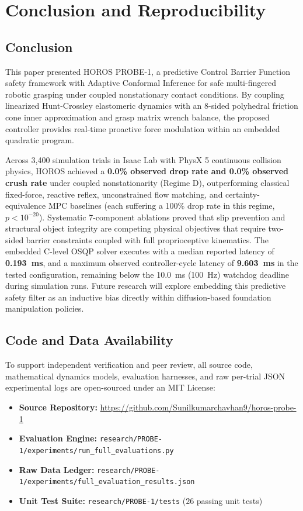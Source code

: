 \section{Conclusion and Reproducibility}
\label{sec:conclusion}

\subsection{Conclusion}
This paper presented HOROS PROBE-1, a predictive Control Barrier Function safety framework with Adaptive Conformal Inference for safe multi-fingered robotic grasping under coupled nonstationary contact conditions. By coupling linearized Hunt-Crossley elastomeric dynamics with an 8-sided polyhedral friction cone inner approximation and grasp matrix wrench balance, the proposed controller provides real-time proactive force modulation within an embedded quadratic program. 

Across 3,400 simulation trials in Isaac Lab with PhysX 5 continuous collision physics, HOROS achieved a \textbf{0.0\% observed drop rate and 0.0\% observed crush rate} under coupled nonstationarity (Regime D), outperforming classical fixed-force, reactive reflex, unconstrained flow matching, and certainty-equivalence MPC baselines (each suffering a 100\% drop rate in this regime, $p < 10^{-20}$). Systematic 7-component ablations proved that slip prevention and structural object integrity are competing physical objectives that require two-sided barrier constraints coupled with full proprioceptive kinematics. The embedded C-level OSQP solver executes with a median reported latency of \textbf{0.193~ms}, and a maximum observed controller-cycle latency of \textbf{9.603~ms} in the tested configuration, remaining below the 10.0~ms (100~Hz) watchdog deadline during simulation runs. Future research will explore embedding this predictive safety filter as an inductive bias directly within diffusion-based foundation manipulation policies.

\subsection{Code and Data Availability}
To support independent verification and peer review, all source code, mathematical dynamics models, evaluation harnesses, and raw per-trial JSON experimental logs are open-sourced under an MIT License:
\begin{itemize}
    \item \textbf{Source Repository:} \url{https://github.com/Sunilkumarchavhan9/horos-probe-1}
    \item \textbf{Evaluation Engine:} \texttt{research/PROBE-1/experiments/run\_full\_evaluations.py}
    \item \textbf{Raw Data Ledger:} \texttt{research/PROBE-1/experiments/full\_evaluation\_results.json}
    \item \textbf{Unit Test Suite:} \texttt{research/PROBE-1/tests} ($26$ passing unit tests)
\end{itemize}

